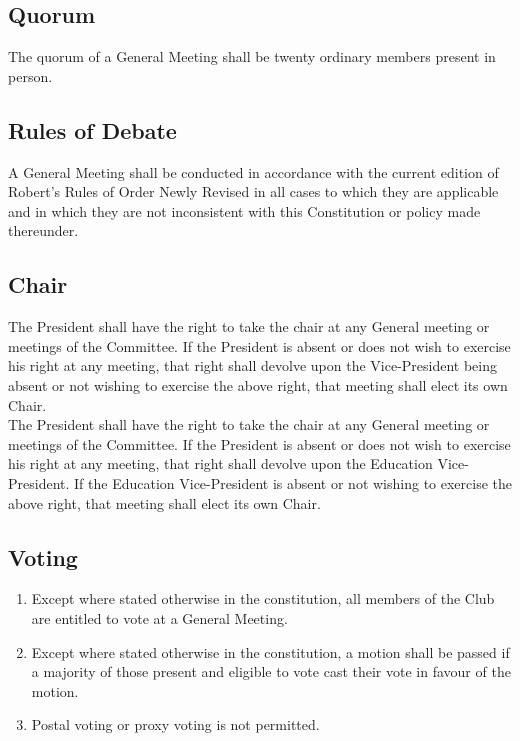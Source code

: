 \documentclass[11pt]{article} %
\begin{document}
\subsection{Quorum}
The quorum of a General Meeting shall be twenty ordinary members present in person.

\subsection{Rules of Debate}
A General Meeting shall be conducted in accordance with the current edition of Robert’s Rules of Order Newly Revised in all cases to which they are applicable and in which they are not inconsistent with this Constitution or policy made thereunder.

\subsection{Chair}
{\color{red}The President shall have the right to take the chair at any General meeting or meetings of the Committee. If the President is absent or does not wish to exercise his right at any meeting, that right shall devolve upon the Vice-President being absent or not wishing to exercise the above right, that meeting shall elect its own Chair.}\\
{\color{ForestGreen}The President shall have the right to take the chair at any General meeting or meetings of the Committee. If the President is absent or does not wish to exercise his right at any meeting, that right shall devolve upon the Education Vice-President.  If the Education Vice-President is absent or not wishing to exercise the above right, that meeting shall elect its own Chair.}

\subsection{Voting}
\begin{enumerate}
	\item Except where stated otherwise in the constitution, all members of the Club are entitled to vote at a General Meeting.
	\item Except where stated otherwise in the constitution, a motion shall be passed if a majority of those present and eligible to vote cast their vote in favour of the motion.
	\item Postal voting or proxy voting is not permitted.
\end{enumerate}
\end{document}
